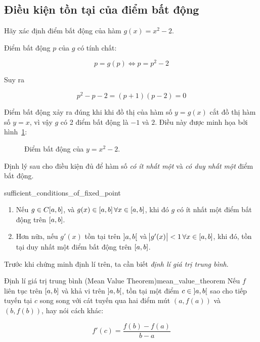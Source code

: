 \documentclass[../../Lectures]{subfiles}
\begin{document}
\subsection{Điều kiện tồn tại của điểm bất động}

\begin{exmp}
    Hãy xác định điểm bất động của hàm \(g(x) = x^2 - 2\).

    Điểm bất động \(p\) của \(g\) có tính chất:

    \[p= g(p) \iff p = p^2 - 2\]

    Suy ra

    \[p^2 - p - 2 = (p + 1)(p - 2) = 0\]

    Điểm bất động xảy ra đúng khi khi đồ thị của hàm số \(y = g(x)\) cắt đồ thị
    hàm số \(y = x\), vì vậy \(g\) có 2 điểm bất động là \(-1\) và \(2\). Điều
    này được minh họa bởi hình~\ref{fig:exmp_2.2_fixed_point}:

    \begin{figure}[!h]
        \centering
        
        \caption{Điểm bất động của \(y = x^2 - 2\).}
        \label{fig:exmp_2.2_fixed_point}    %
    \end{figure}
\end{exmp}

Định lý sau cho điều kiện đủ để hàm số \emph{có ít nhất một} và \emph{có duy
nhất một} điểm bất động.

\begin{ctheorem}{}{sufficient_conditions_of_fixed_point}
\begin{enumerate}
    \item Nếu \(g \in C \interval{a}{b}\), và \(g(x) \in \interval{a}{b} \,
        \forall x \in \interval{a}{b}\), khi đó \(g\) có ít nhất một điểm bất
        động trên \(\interval{a}{b}\).

    \item Hơn nữa, nếu \(g'(x)\) tồn tại trên \(\interval[open]{a}{b}\) và
        \(\abs{g'(x)} < 1 \, \forall x \in \interval{a}{b}\), khi đó, tồn tại
        duy nhất một điểm bất động trên \(\interval{a}{b}\).
\end{enumerate}
\end{ctheorem}

Trước khi chứng minh định lí trên, ta cần biết \emph{định lí giá trị trung
bình}.

\begin{ctheorem}{Định lí giá trị trung bình (Mean Value Theorem)}{mean_value_theorem}
    Nếu \(f\) liên tục trên \(\interval{a}{b}\) và khả vi trên
    \(\interval[open]{a}{b}\), tồn tại một điểm \(c \in \interval[open]{a}{b}\)
    sao cho tiếp tuyến tại \(c\) song song với cát tuyến qua hai điểm mút \((a,
    f(a))\) và \((b, f(b))\), hay nói cách khác:

    \[f'(c) = \frac{f(b) - f(a)}{b - a}\]
\end{ctheorem}
\end{document}
